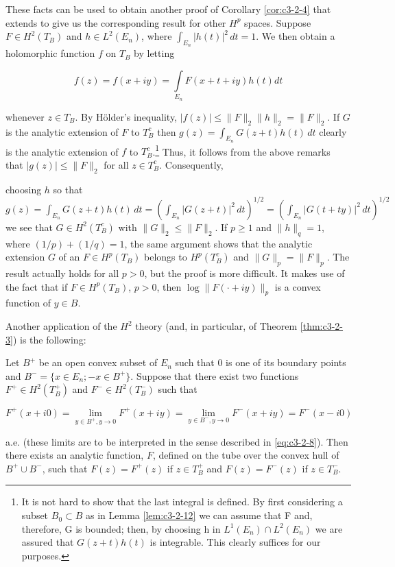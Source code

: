 These facts can be used to obtain another proof of Corollary \ref{cor:c3-2-4} that extends to give us the corresponding result for other $H^p$ spaces. Suppose $F \in H^2(T_B)$ and $h \in L^2(E_n)$, where $\int_{E_n} |h(t)|^2 \, dt = 1$. We then obtain a holomorphic function $f$ on $T_B$ by letting

\[
f(z)=f(x+i y)=\int\limits_{E_{n}}F(x+t+i y)h(t)d t
\]

whenever $z \in T_B$. By Hölder's inequality, $|f(z)| \leq \|F\|_2 \|h\|_2 = \|F\|_2$. If $G$ is the analytic extension of $F$ to $T_B^c$ then $g(z) = \int_{E_n} G(z + t) h(t) \, dt$ clearly is the analytic extension of $f$ to $T_B^c$.\footnote{It is not hard to show that the last integral is defined. By first considering a subset $B_{0} \subset B$ as in Lemma \ref{lem:c3-2-12} we can assume that F and, therefore, G is bounded; then, by choosing h in $L^{1}(E_{n}) \cap L^{2}(E_{n})$ we are assured that $G(z + t)h(t)$ is integrable. This clearly suffices for our purposes.} Thus, it follows from the above remarks that $|g(z)| \leq \|F\|_2$ for all $z \in T_B^c$. Consequently,

choosing $h$ so that $g(z) = \int_{E_n} G(z + t)h(t) \, dt = (\int_{E_n} |G(z + t)|^2 \, dt)^{1/2} = (\int_{E_n} |G(t + ty)|^2 \, dt)^{1/2}$ we see that $G \in H^2(T_B^c)$ with $\|G\|_2 \leq \|F\|_2$. If $p \geq 1$ and $\|h\|_q = 1$, where $(1/p) + (1/q) = 1$, the same argument shows that the analytic extension $G$ of an $F \in H^p(T_B)$ belongs to $H^p(T_B^c)$ and $\|G\|_p = \|F\|_p$. The result actually holds for all $p > 0$, but the proof is more difficult. It makes use of the fact that if $F \in H^p(T_B)$, $p > 0$, then $\log \|F(\cdot + iy)\|_p$ is a convex function of $y \in B$.

 Another application of the $H^{2}$ theory (and, in particular, of Theorem \ref{thm:c3-2-3}) is the following:

Let $B^+$ be an open convex subset of $E_n$ such that 0 is one of its boundary points and $B^- = \{x \in E_n; -x \in B^+\}$. Suppose that there exist two functions $F^+ \in H^2(T_B^+)$ and $F^- \in H^2(T_B^-)$ such that

\[
F^{+}(x+i0)=\lim_{y\in B^{+},y\to0}F^{+}(x+iy)=\lim_{y\in B^{-},y\to0}F^{-}(x+iy)=F^{-}(x-i0)
\]

a.e. (these limits are to be interpreted in the sense described in \eqref{eq:c3-2-8}). Then there exists an analytic function, $F$, defined on the tube over the convex hull of $B^+ \cup B^-$, such that $F(z) = F^+(z)$ if $z \in T_B^+$ and $F(z) = F^-(z)$ if $z \in T_B^-$.


